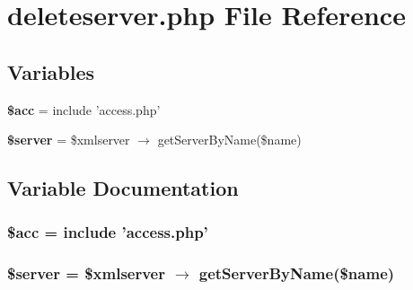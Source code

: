 \section{deleteserver.php File Reference}
\label{deleteserver_8php}


\subsection*{Variables}
\begin{CompactItemize}
\item 
{\bf \$acc} = include 'access.php'
\item 
{\bf \$server} = \$xmlserver $\rightarrow$ get\-Server\-By\-Name(\$name)
\end{CompactItemize}


\subsection{Variable Documentation}
\subsubsection{\setlength{\rightskip}{0pt plus 5cm}\$acc = include 'access.php'}\label{deleteserver_8php_542926c588a05eb69553d79c83cf73da}


\subsubsection{\setlength{\rightskip}{0pt plus 5cm}\$server = \$xmlserver $\rightarrow$ get\-Server\-By\-Name(\$name)}\label{deleteserver_8php_d135cc8a47e55f0829949cf62214170f}


